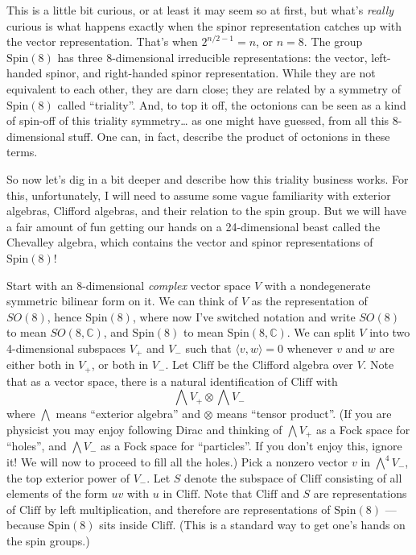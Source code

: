 \documentclass{article}
\begin{document}
This is a little bit curious, or at least it may seem so at first, but
what's \emph{really} curious is what happens exactly when the spinor
representation catches up with the vector representation. That's when
\(2^{n/2-1} = n\), or \(n = 8\). The group \(\mathrm{Spin}(8)\) has
three 8-dimensional irreducible representations: the vector, left-handed
spinor, and right-handed spinor representation. While they are not
equivalent to each other, they are darn close; they are related by a
symmetry of \(\mathrm{Spin}(8)\) called ``triality''. And, to top it
off, the octonions can be seen as a kind of spin-off of this triality
symmetry\ldots{} as one might have guessed, from all this 8-dimensional
stuff. One can, in fact, describe the product of octonions in these
terms.

So now let's dig in a bit deeper and describe how this triality business
works. For this, unfortunately, I will need to assume some vague
familiarity with exterior algebras, Clifford algebras, and their
relation to the spin group. But we will have a fair amount of fun
getting our hands on a 24-dimensional beast called the Chevalley
algebra, which contains the vector and spinor representations of
\(\mathrm{Spin}(8)\)!

Start with an 8-dimensional \emph{complex} vector space \(V\) with a
nondegenerate symmetric bilinear form on it. We can think of \(V\) as
the representation of \(SO(8)\), hence \(\mathrm{Spin}(8)\), where now
I've switched notation and write \(SO(8)\) to mean \(SO(8,\mathbb{C})\),
and \(\mathrm{Spin}(8)\) to mean \(\mathrm{Spin}(8,\mathbb{C})\). We can
split \(V\) into two 4-dimensional subspaces \(V_+\) and \(V_-\) such
that \(\langle v,w\rangle = 0\) whenever \(v\) and \(w\) are either both
in \(V_+\), or both in \(V_-\). Let \(\mathrm{Cliff}\) be the Clifford
algebra over \(V\). Note that as a vector space, there is a natural
identification of \(\mathrm{Cliff}\) with
\[\bigwedge V_+ \otimes \bigwedge V_-\] where \(\bigwedge\) means
``exterior algebra'' and \(\otimes\) means ``tensor product''. (If you
are physicist you may enjoy following Dirac and thinking of
\(\bigwedge V_+\) as a Fock space for ``holes'', and \(\bigwedge V_-\)
as a Fock space for ``particles''. If you don't enjoy this, ignore it!
We will now to proceed to fill all the holes.) Pick a nonzero vector
\(v\) in \(\bigwedge^4 V_-\), the top exterior power of \(V_-\). Let
\(S\) denote the subspace of \(\mathrm{Cliff}\) consisting of all
elements of the form \(uv\) with \(u\) in \(\mathrm{Cliff}\). Note that
\(\mathrm{Cliff}\) and \(S\) are representations of \(\mathrm{Cliff}\)
by left multiplication, and therefore are representations of
\(\mathrm{Spin}(8)\) --- because \(\mathrm{Spin}(8)\) sits inside
\(\mathrm{Cliff}\). (This is a standard way to get one's hands on the
spin groups.)
\end{document}
